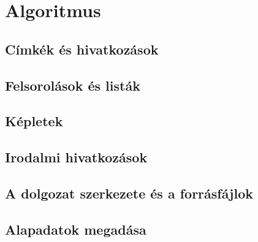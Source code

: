 \chapter{Algoritmus}


\section{Címkék és hivatkozások}


\section{Felsorolások és listák}


\section{Képletek}

\section{Irodalmi hivatkozások}


\section{A dolgozat szerkezete és a forrásfájlok}


\section{Alapadatok megadása}







